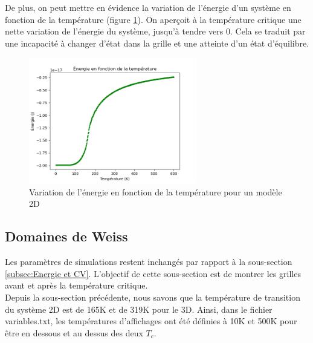 \documentclass{article}
\begin{document}
De plus, on peut mettre en évidence la variation de l'énergie d'un système en fonction de la température (figure \ref{energie}). On aperçoit à la température critique une nette variation de l'énergie du système, jusqu'à tendre vers 0. Cela se traduit par une incapacité à changer d'état dans la grille et une atteinte d'un état d'équilibre.  

\begin{figure}[ht]
  \centering
  \includegraphics[height=5.5cm]{Tc/Energie plot.png}
  \caption{Variation de l'énergie en fonction de la température pour un modèle 2D}
  \label{energie}
\end{figure}


\newpage
\subsection{Domaines de Weiss}

Les paramètres de simulations restent inchangés par rapport à la sous-section \ref{subsec:Energie et CV}. L'objectif de cette sous-section est de montrer les grilles avant et après la température critique. \\

Depuis la sous-section précédente, nous savons que la température de transition du système 2D est de 165K et de 319K pour le 3D. Ainsi, dans le fichier variables.txt, les températures d'affichages ont été définies à 10K et 500K pour être en dessous et au dessus des deux $T_{c}$.
\end{document}
